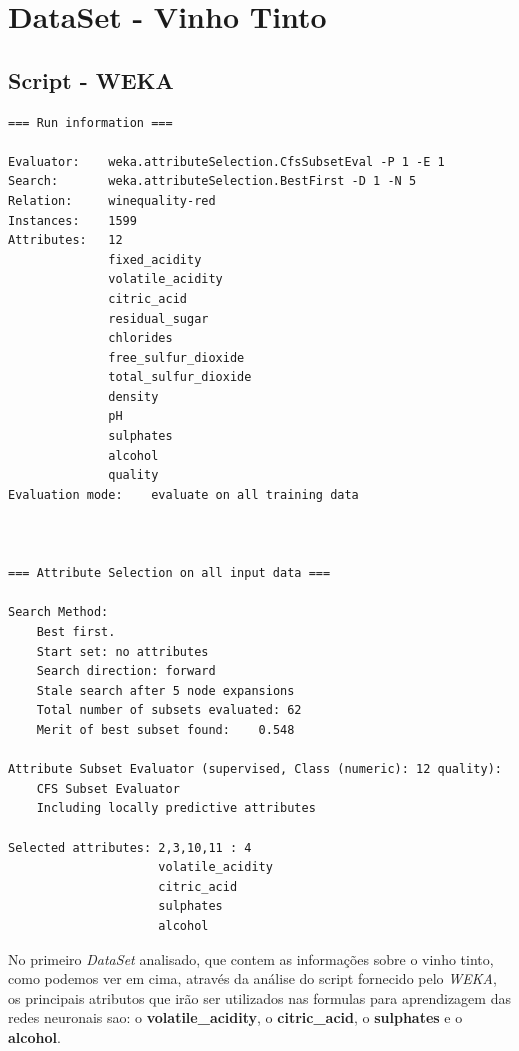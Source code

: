 \documentclass{report}
\begin{document}
\section{DataSet - Vinho Tinto}
\subsection{Script - WEKA}
\begin{verbatim}
=== Run information ===

Evaluator:    weka.attributeSelection.CfsSubsetEval -P 1 -E 1
Search:       weka.attributeSelection.BestFirst -D 1 -N 5
Relation:     winequality-red
Instances:    1599
Attributes:   12
              fixed_acidity
              volatile_acidity
              citric_acid
              residual_sugar
              chlorides
              free_sulfur_dioxide
              total_sulfur_dioxide
              density
              pH
              sulphates
              alcohol
              quality
Evaluation mode:    evaluate on all training data



=== Attribute Selection on all input data ===

Search Method:
	Best first.
	Start set: no attributes
	Search direction: forward
	Stale search after 5 node expansions
	Total number of subsets evaluated: 62
	Merit of best subset found:    0.548

Attribute Subset Evaluator (supervised, Class (numeric): 12 quality):
	CFS Subset Evaluator
	Including locally predictive attributes

Selected attributes: 2,3,10,11 : 4
                     volatile_acidity
                     citric_acid
                     sulphates
                     alcohol
\end{verbatim}

No primeiro \textit{DataSet} analisado, que contem as informações sobre o vinho tinto, como podemos ver em cima, através da análise do script fornecido pelo \textit{WEKA}, os principais atributos que irão ser utilizados nas formulas para aprendizagem das redes neuronais sao: o \textbf{volatile\_acidity}, o \textbf{citric\_acid}, o \textbf{sulphates} e o \textbf{alcohol}.
\end{document}
